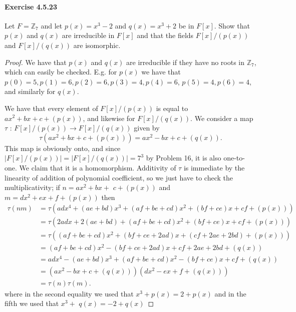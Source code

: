 \documentclass{article}
\begin{document}
\paragraph{Exercise 4.5.23} Let $F = \mathbb{Z}_7$ and let $p(x) = x^3 - 2$ and $q(x) = x^3 + 2$ be in $F[x]$. Show that $p(x)$ and $q(x)$ are irreducible in $F[x]$ and that the fields $F[x]/(p(x))$ and $F[x]/(q(x))$ are isomorphic.
\begin{proof}
    We have that $p(x)$ and $q(x)$ are irreducible if they have no roots in $\mathbb{Z}_7$, which can easily be checked. E.g. for $p(x)$ we have that $p(0)=5, p(1)=6, p(2)=6, p(3)=4, p(4)=6$, $p(5)=4, p(6)=4$, and similarly for $q(x)$.

We have that every element of $F[x] /(p(x))$ is equal to $a x^2+b x+c+(p(x))$, and likewise for $F[x] /(q(x))$. We consider a map $\tau$ : $F[x] /(p(x)) \rightarrow F[x] /(q(x))$ given by
$$
\tau\left(a x^2+b x+c+(p(x))\right)=a x^2-b x+c+(q(x)) .
$$
This map is obviously onto, and since $|F[x] /(p(x))|=|F[x] /(q(x))|=7^3$ by Problem 16, it is also one-to-one. We claim that it is a homomorphism. Additivity of $\tau$ is immediate by the linearity of addition of polynomial coefficient, so we just have to check the multiplicativity; if $n=a x^2+b x+$ $c+(p(x))$ and $m=d x^2+e x+f+(p(x))$ then
$$
\begin{aligned}
\tau(n m) & =\tau\left(a d x^4+(a e+b d) x^3+(a f+b e+c d) x^2+(b f+c e) x+c f+(p(x))\right) \\
& =\tau\left(2 a d x+2(a e+b d)+(a f+b e+c d) x^2+(b f+c e) x+c f+(p(x))\right) \\
& =\tau\left((a f+b e+c d) x^2+(b f+c e+2 a d) x+(c f+2 a e+2 b d)+(p(x))\right) \\
& =(a f+b e+c d) x^2-(b f+c e+2 a d) x+c f+2 a e+2 b d+(q(x)) \\
& =a d x^4-(a e+b d) x^3+(a f+b e+c d) x^2-(b f+c e) x+c f+(q(x)) \\
& =\left(a x^2-b x+c+(q(x))\right)\left(d x^2-e x+f+(q(x))\right) \\
& =\tau(n) \tau(m) .
\end{aligned}
$$
where in the second equality we used that $x^3+p(x)=2+p(x)$ and in the fifth we used that $x^3+$ $q(x)=-2+q(x)$
\end{proof}
\end{document}
